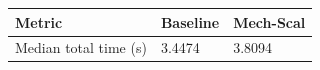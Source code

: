 \begin{tabular}{lll}
\hline
Metric & Baseline & Mech-Scal \\
\hline
Median total time (s) & 3.4474 & 3.8094 \\
\hline
\end{tabular}

